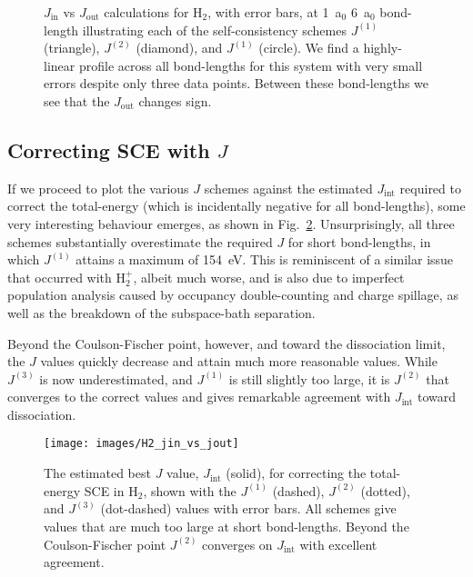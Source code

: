 \begin{figure}[th!]
\centering
{}
\quad
%
%
\caption[$J_\textrm{in}$ vs $J_\textrm{out}$ calculations 
for H$_2$ at 1~a$_0$ and 6~a$_0$ bond-length]
{$J_\textrm{in}$ vs $J_\textrm{out}$ calculations for H$_2$, 
with error bars, 
at 
1~a$_0$
6~a$_0$ bond-length 
illustrating each of the 
self-consistency schemes 
$J^{(1)}$ (triangle), 
$J^{(2)}$ (diamond), 
and $J^{(1)}$ (circle).
%
We find a highly-linear profile across 
all bond-lengths for this system 
with very small errors despite 
only three data points.
%
Between these bond-lengths we see that 
the $J_\textrm{out}$ changes sign.}
\label{fig:H2_jin_vs_jout}
\end{figure}


\subsection{Correcting SCE with $J$}

If we proceed to plot the various $J$ schemes 
against the estimated $J_\textrm{int}$ required to correct the total-energy 
(which is incidentally negative for all bond-lengths), 
some very interesting behaviour emerges, 
as shown in Fig.~\ref{fig:H2_jout_schemes}.
%
Unsurprisingly, 
all three schemes substantially overestimate 
the required $J$ for short bond-lengths, 
in which $J^{(1)}$ attains a maximum of 154~eV.
%
This is reminiscent of a similar issue
that occurred with H$_2^+$, 
albeit much worse, 
and is also due to imperfect population analysis 
caused by occupancy 
double-counting and charge spillage,
as well as the breakdown of the 
subspace-bath separation. 

Beyond the Coulson-Fischer point, however, 
and toward the dissociation limit, 
the $J$ values quickly decrease 
and attain much more reasonable values.
%
While $J^{(3)}$ is now underestimated, 
and $J^{(1)}$ is still slightly too large, 
it is $J^{(2)}$ that converges to the correct values 
and gives remarkable agreement with 
$J_\textrm{int}$ toward dissociation.

\begin{figure}[th!]
\centering
\texttt{[image: images/H2\_jin\_vs\_jout]}
\caption[Calculated $J_\textrm{out}$ schemes for dissociating H$_2$]
{The estimated best $J$ value,
$J_\textrm{int}$ (solid),  for correcting the total-energy
SCE in H$_2$, shown with the
$J^{(1)}$ (dashed), 
$J^{(2)}$ (dotted), and 
$J^{(3)}$ (dot-dashed) values 
with error bars.
%
All schemes give values that are much too large 
at short bond-lengths. 
%
Beyond the Coulson-Fischer point 
$J^{(2)}$ converges on $J_\textrm{int}$ 
with excellent agreement.}
\label{fig:H2_jout_schemes}
\end{figure}
%



